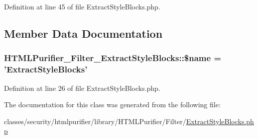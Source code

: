Definition at line 45 of file Extract\+Style\+Blocks.\+php.



\subsection{Member Data Documentation}
\hypertarget{classHTMLPurifier__Filter__ExtractStyleBlocks_af3c579b4f5e79ab1784baf5f321daf5c}{
\subsubsection[{\$name}]{\setlength{\rightskip}{0pt plus 5cm}H\+T\+M\+L\+Purifier\+\_\+\+Filter\+\_\+\+Extract\+Style\+Blocks\+::\$name = 'Extract\+Style\+Blocks'}}\label{classHTMLPurifier__Filter__ExtractStyleBlocks_af3c579b4f5e79ab1784baf5f321daf5c}


Definition at line 26 of file Extract\+Style\+Blocks.\+php.



The documentation for this class was generated from the following file\+:\begin{DoxyCompactItemize}
\item 
classes/security/htmlpurifier/library/\+H\+T\+M\+L\+Purifier/\+Filter/\hyperlink{ExtractStyleBlocks_8php}{Extract\+Style\+Blocks.\+php}\end{DoxyCompactItemize}
